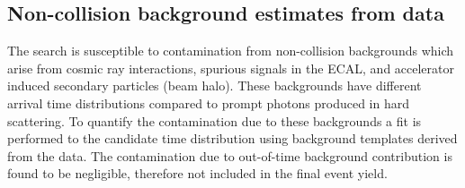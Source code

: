 





\subsection{Non-collision background estimates from data}

The search is susceptible to contamination from non-collision backgrounds which arise from cosmic ray interactions, spurious signals in the ECAL, and accelerator induced secondary particles (beam halo). These backgrounds have different arrival time distributions compared to prompt photons produced in hard scattering. To quantify the contamination due to these backgrounds a fit is performed to the candidate time distribution using background templates derived from the data. The contamination due to out-of-time background contribution is found to be negligible, therefore not included in the final event yield.

